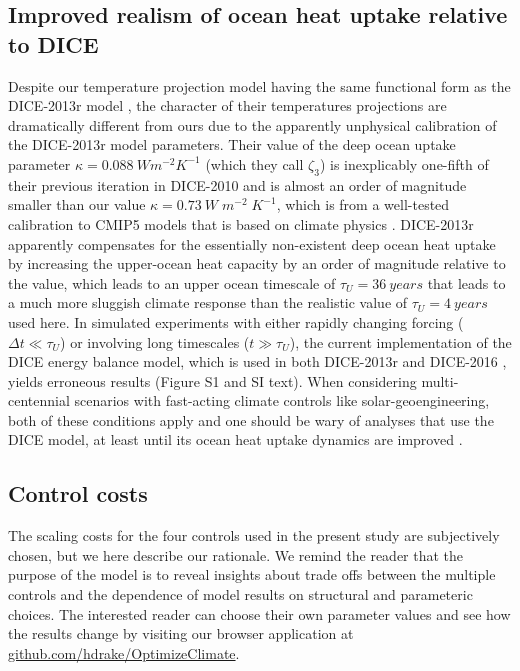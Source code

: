 \documentclass[9pt,twocolumn,twoside,lineno]{pnas-new}
\begin{document}
{\subsection*{Improved realism of ocean heat uptake relative to DICE}
Despite our temperature projection model having the same functional form as the DICE-2013r model \cite{nordhaus2013dice}, the character of their temperatures projections are dramatically different from ours due to the apparently unphysical calibration of the DICE-2013r model parameters. Their value of the deep ocean uptake parameter $\kappa = \SI{0.088}{W m^{-2} K^{-1}}$ (which they call $\zeta_{3}$) is inexplicably one-fifth of their previous iteration in DICE-2010 \cite{calel_physics_2016} and is almost an order of magnitude smaller than our value $\kappa = \SI{0.73}{W\; m^{-2}\; K^{-1}}$, which is from a well-tested calibration to CMIP5 models that is based on climate physics \cite{geoffroy_transient_2012}. DICE-2013r apparently compensates for the essentially non-existent deep ocean heat uptake by increasing the upper-ocean heat capacity by an order of magnitude relative to the \cite{geoffroy_transient_2012} value, which leads to an upper ocean timescale of $\tau_{U} = \SI{36}{years}$ that leads to a much more sluggish climate response than the realistic value of $\tau_{U} = \SI{4}{years}$ used here. In simulated experiments with either rapidly changing forcing ($\Delta t \ll \tau_{U}$) or involving long timescales ($t \gg \tau_{U}$), the current implementation of the DICE energy balance model, which is used in both DICE-2013r \cite{nordhaus2013dice} and DICE-2016 \cite{nordhaus_revisiting_2017}, yields erroneous results (Figure S1 and SI text). When considering multi-centennial scenarios with fast-acting climate controls like solar-geoengineering, both of these conditions apply and one should be wary of analyses that use the DICE model, at least until its ocean heat uptake dynamics are improved \cite{calel_physics_2016}.

\subsection*{Control costs}
The scaling costs for the four controls used in the present study are subjectively chosen, but we here describe our rationale. We remind the reader that the purpose of the model is to reveal insights about trade offs between the multiple controls and the dependence of model results on structural and parameteric choices. The interested reader can choose their own parameter values and see how the results change by visiting our browser application at \url{github.com/hdrake/OptimizeClimate}.

}
\end{document}

